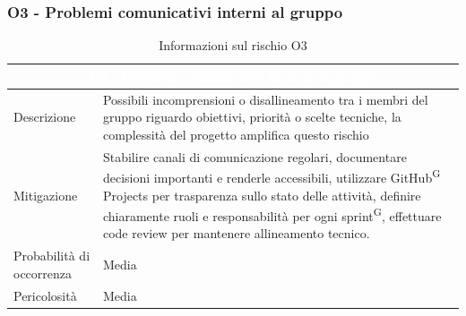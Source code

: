 \documentclass[a4paper, 11pt]{article}
\begin{document}
\subsubsection{O3 - Problemi comunicativi interni al gruppo}
\begin{table}[H]
  \centering
  \begin{tabular}{|p{}|p{}|}
  	\hline
  	\multicolumn{2}{|c|}{\cellcolor{AccentColor}\textcolor{white}{\textbf{O3 - Problemi comunicativi interni al gruppo}}} \\ 
        \hline
        Descrizione & Possibili incomprensioni o disallineamento tra i membri del gruppo riguardo obiettivi, priorità o scelte tecniche, la complessità del progetto amplifica questo rischio \\ 
        \hline
        Mitigazione & Stabilire canali di comunicazione regolari, documentare decisioni importanti e renderle accessibili, utilizzare GitHub\textsuperscript{G} Projects per trasparenza sullo stato delle attività, definire chiaramente ruoli e responsabilità per ogni sprint\textsuperscript{G}, effettuare code review per mantenere allineamento tecnico. \\ 
        \hline
        Probabilità di occorrenza & Media \\
        \hline
        Pericolosità & Media \\
        \hline
    \end{tabular}
  \caption{Informazioni sul rischio O3}
\end{table}
\end{document}

